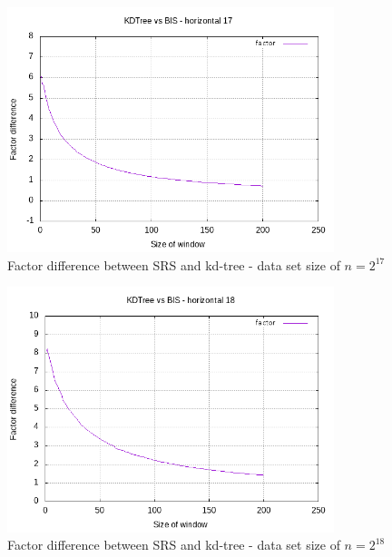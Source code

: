 \begin{figure}[h]
    \centering
    \includegraphics[width = 0.85\textwidth]{pictures/analysis/smalls/hori_fac_17.png}
    \caption{Factor difference between SRS and kd-tree - data set size of $n=2^{17}$}\label{fig:small_hori_fac_17}
\end{figure}

\begin{figure}[h]
    \centering
    \includegraphics[width = 0.85\textwidth]{pictures/analysis/smalls/hori_fac_18.png}
    \caption{Factor difference between SRS and kd-tree - data set size of $n=2^{18}$}\label{fig:small_hori_fac_18}
\end{figure}

